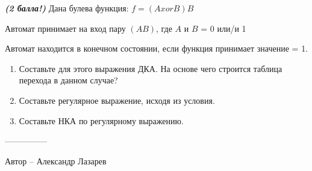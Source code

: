 \question
\textbf{\textit{(2 балла!)}} Дана булева функция: $f = (A xor B) B$

Автомат принимает на вход пару $(AB)$, где $A$ и $B$ = 0 или/и 1

Автомат находится в конечном состоянии, если функция принимает значение = 1.

\begin{enumerate}
	\item Составьте для этого выражения ДКА. На основе чего строится таблица перехода в данном случае?
	\item Составьте регулярное выражение, исходя из условия.
	\item Составьте НКА по регулярному выражению.
\end{enumerate}

---------------

Автор -- Александр Лазарев
